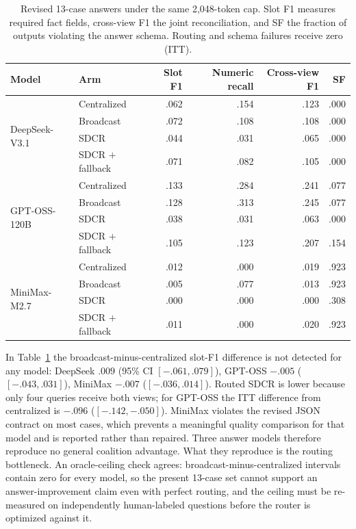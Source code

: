 \documentclass{article}
\begin{document}
\begin{table}[t]
\centering
\caption{Revised 13-case answers under the same 2,048-token cap. Slot F1 measures required fact fields, cross-view F1 the joint reconciliation, and SF the fraction of outputs violating the answer schema. Routing and schema failures receive zero (ITT).}
\label{tab:answers}
\small
\begin{tabular}{llrrrr}
\toprule
Model & Arm & Slot F1 & Numeric recall & Cross-view F1 & SF\\
\midrule
\multirow{4}{*}{DeepSeek-V3.1} & Centralized & .062 & .154 & .123 & .000\\
 & Broadcast & .072 & .108 & .108 & .000\\
 & SDCR & .044 & .031 & .065 & .000\\
 & SDCR $+$ fallback & .071 & .082 & .105 & .000\\
\midrule
\multirow{4}{*}{GPT-OSS-120B} & Centralized & .133 & .284 & .241 & .077\\
 & Broadcast & .128 & .313 & .245 & .077\\
 & SDCR & .038 & .031 & .063 & .000\\
 & SDCR $+$ fallback & .105 & .123 & .207 & .154\\
\midrule
\multirow{4}{*}{MiniMax-M2.7} & Centralized & .012 & .000 & .019 & .923\\
 & Broadcast & .005 & .077 & .013 & .923\\
 & SDCR & .000 & .000 & .000 & .308\\
 & SDCR $+$ fallback & .011 & .000 & .020 & .923\\
\bottomrule
\end{tabular}
\end{table}

In Table~\ref{tab:answers} the broadcast-minus-centralized slot-F1 difference is not detected for any model: DeepSeek $.009$ (95\% CI $[-.061,.079]$), GPT-OSS $-.005$ ($[-.043,.031]$), MiniMax $-.007$ ($[-.036,.014]$). Routed SDCR is lower because only four queries receive both views; for GPT-OSS the ITT difference from centralized is $-.096$ ($[-.142,-.050]$). MiniMax violates the revised JSON contract on most cases, which prevents a meaningful quality comparison for that model and is reported rather than repaired. Three answer models therefore reproduce no general coalition advantage. What they reproduce is the routing bottleneck. An oracle-ceiling check agrees: broadcast-minus-centralized intervals contain zero for every model, so the present 13-case set cannot support an answer-improvement claim even with perfect routing, and the ceiling must be re-measured on independently human-labeled questions before the router is optimized against it.
\end{document}
